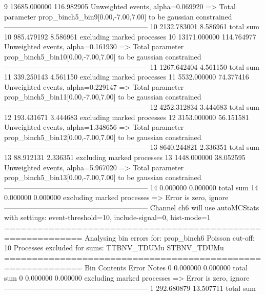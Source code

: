 9          13685.000000    116.982905      Unweighted events, alpha=0.069920
  => Total parameter prop_binch5_bin9[0.00,-7.00,7.00] to be gaussian constrained
------------------------------------------------------------
10         2132.783001     8.586961        total sum                     
10         985.479192      8.586961        excluding marked processes    
10         13171.000000    114.764977      Unweighted events, alpha=0.161930
  => Total parameter prop_binch5_bin10[0.00,-7.00,7.00] to be gaussian constrained
------------------------------------------------------------
11         1267.642404     4.561150        total sum                     
11         339.250143      4.561150        excluding marked processes    
11         5532.000000     74.377416       Unweighted events, alpha=0.229147
  => Total parameter prop_binch5_bin11[0.00,-7.00,7.00] to be gaussian constrained
------------------------------------------------------------
12         4252.312834     3.444683        total sum                     
12         193.431671      3.444683        excluding marked processes    
12         3153.000000     56.151581       Unweighted events, alpha=1.348656
  => Total parameter prop_binch5_bin12[0.00,-7.00,7.00] to be gaussian constrained
------------------------------------------------------------
13         8640.244821     2.336351        total sum                     
13         88.912131       2.336351        excluding marked processes    
13         1448.000000     38.052595       Unweighted events, alpha=5.967020
  => Total parameter prop_binch5_bin13[0.00,-7.00,7.00] to be gaussian constrained
------------------------------------------------------------
14         0.000000        0.000000        total sum                     
14         0.000000        0.000000        excluding marked processes    
  => Error is zero, ignore      
------------------------------------------------------------
Channel ch6 will use autoMCStats with settings: event-threshold=10, include-signal=0, hist-mode=1
============================================================
Analysing bin errors for: prop_binch6
Poisson cut-off: 10
Processes excluded for sums: TTBNV_TDUMu STBNV_TDUMu
============================================================
Bin        Contents        Error           Notes                         
0          0.000000        0.000000        total sum                     
0          0.000000        0.000000        excluding marked processes    
  => Error is zero, ignore      
------------------------------------------------------------
1          292.680879      13.507711       total sum                     
